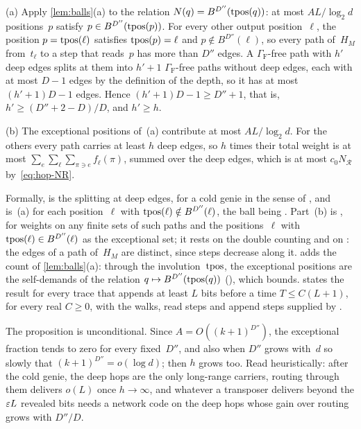 \begin{outline}
(a) Apply \cref{lem:balls}(a) to the relation $N(q)=B^{D''}(\operatorname{tpos}(q))$: at most $AL/\log_2d$ positions~$p$ satisfy
$p\in B^{D''}(\operatorname{tpos}(p))$. For every other output position~$\ell$, the position $p=\operatorname{tpos}(\ell)$ satisfies $\operatorname{tpos}(p)=\ell$
and $p\notin B^{D''}(\ell)$, so every path of~$H_M$ from~$t_\ell$ to a step that reads~$p$ has more than $D''$ edges. A
$\Gamma_{\mathrm F}$-free path with $h'$ deep edges splits at them into $h'+1$ $\Gamma_{\mathrm F}$-free paths without
deep edges, each with at most $D-1$ edges by the definition of the depth, so it has at most $(h'+1)D-1$ edges. Hence
$(h'+1)D-1\ge D''+1$, that is, $h'\ge(D''+2-D)/D$, and $h'\ge h$.

(b) The exceptional positions of~(a) contribute at most $AL/\log_2d$. For the others every path carries at least $h$
deep edges, so $h$ times their total weight is at most $\sum_e\sum_\ell\sum_{\pi\ni e}f_\ell(\pi)$, summed over the deep
edges, which is at most $c_0N_{\mathcal R}$ by~\eqref{eq:hop-NR}.

Formally,  is the splitting at deep edges, for a cold genie in the sense of
, and  is~(a) for each position~$\ell$ with
$\operatorname{tpos}(\ell)\notin B^{D''}(\ell)$, the ball being . Part~(b) is ,
for weights on any finite sets of such paths and the positions~$\ell$ with $\operatorname{tpos}(\ell)\in B^{D''}(\ell)$ as the
exceptional set; it rests on the double counting  and on
: the edges of a path of~$H_M$ are distinct, since steps decrease along it.
 adds the count of \cref{lem:balls}(a): through the involution~$\operatorname{tpos}$, the exceptional
positions are the self-demands of the relation $q\mapsto B^{D''}(\operatorname{tpos}(q))$ (),
which  bounds.  states the result for every trace
that appends at least $L$ bits before a time $T\le C(L+1)$, for every real $C\ge0$, with the walks, read steps and
append steps supplied by .
\end{outline}

The proposition is unconditional. Since $A=O((k+1)^{D''})$, the exceptional fraction tends to zero for every fixed~$D''$,
and also when $D''$ grows with~$d$ so slowly that $(k+1)^{D''}=o(\log d)$; then $h$ grows too. Read heuristically: after
the cold genie, the deep hops are the only long-range carriers, routing through them delivers $o(L)$ once $h\to\infty$,
and whatever a transposer delivers beyond the $\varepsilon L$ revealed bits needs a network code on the deep hops whose gain over
routing grows with $D''/D$.

